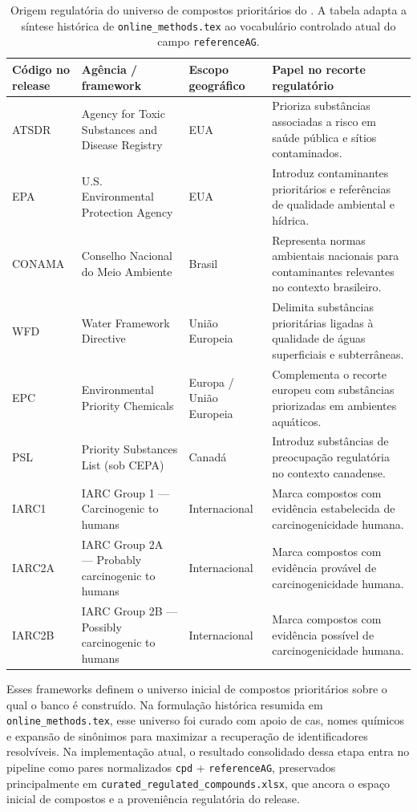 \begin{table}[htbp]
\centering
\caption{Origem regulatória do universo de compostos prioritários do \biorempp{}. A tabela adapta a síntese histórica de \texttt{online\_methods.tex} ao vocabulário controlado atual do campo \texttt{referenceAG}.}
\label{tab:c1-regulatory-sources}
\footnotesize
\begin{tabularx}{\textwidth}{@{}lXlX@{}}
\toprule
\textbf{Código no release} & \textbf{Agência / framework} & \textbf{Escopo geográfico} & \textbf{Papel no recorte regulatório} \\
\midrule
ATSDR & Agency for Toxic Substances and Disease Registry & EUA & Prioriza substâncias associadas a risco em saúde pública e sítios contaminados. \\
EPA & U.S. Environmental Protection Agency & EUA & Introduz contaminantes prioritários e referências de qualidade ambiental e hídrica. \\
CONAMA & Conselho Nacional do Meio Ambiente & Brasil & Representa normas ambientais nacionais para contaminantes relevantes no contexto brasileiro. \\
WFD & Water Framework Directive & União Europeia & Delimita substâncias prioritárias ligadas à qualidade de águas superficiais e subterrâneas. \\
EPC & Environmental Priority Chemicals & Europa / União Europeia & Complementa o recorte europeu com substâncias priorizadas em ambientes aquáticos. \\
PSL & Priority Substances List (sob CEPA) & Canadá & Introduz substâncias de preocupação regulatória no contexto canadense. \\
IARC1 & IARC Group 1 --- Carcinogenic to humans & Internacional & Marca compostos com evidência estabelecida de carcinogenicidade humana. \\
IARC2A & IARC Group 2A --- Probably carcinogenic to humans & Internacional & Marca compostos com evidência provável de carcinogenicidade humana. \\
IARC2B & IARC Group 2B --- Possibly carcinogenic to humans & Internacional & Marca compostos com evidência possível de carcinogenicidade humana. \\
\bottomrule
\end{tabularx}
\end{table}

Esses frameworks definem o universo inicial de compostos prioritários sobre o qual o banco é construído. Na formulação histórica resumida em \texttt{online\_methods.tex}, esse universo foi curado com apoio de \gls{cas}, nomes químicos e expansão de sinônimos para maximizar a recuperação de identificadores resolvíveis. Na implementação atual, o resultado consolidado dessa etapa entra no pipeline como pares normalizados \texttt{cpd} + \texttt{referenceAG}, preservados principalmente em \texttt{curated\_regulated\_compounds.xlsx}, que ancora o espaço inicial de compostos e a proveniência regulatória do release.

